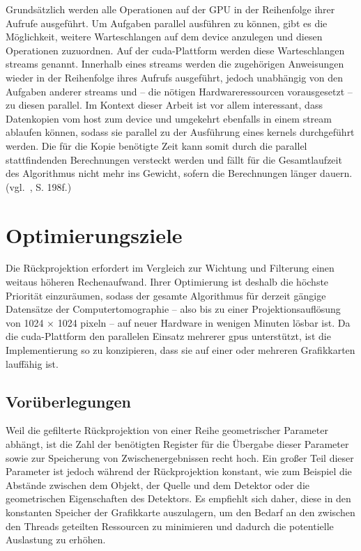 Grundsätzlich werden alle Operationen auf der GPU in der Reihenfolge ihrer Aufrufe ausgeführt. Um Aufgaben parallel
ausführen zu können, gibt es die Möglichkeit, weitere Warteschlangen auf dem \gls{device} anzulegen und diesen
Operationen zuzuordnen. Auf der \gls{cuda}-Plattform werden diese Warteschlangen \glspl{stream} genannt. Innerhalb eines
\glspl{stream} werden die zugehörigen Anweisungen wieder in der Reihenfolge ihres Aufrufs ausgeführt, jedoch unabhängig
von den Aufgaben anderer \glspl{stream} und -- die nötigen Hardwareressourcen vorausgesetzt -- zu diesen parallel. Im
Kontext dieser Arbeit ist vor allem interessant, dass Datenkopien vom \gls{host} zum \gls{device} und umgekehrt
ebenfalls in einem \gls{stream} ablaufen können, sodass sie parallel zu der Ausführung eines \gls{kernel}s durchgeführt
werden. Die für die Kopie benötigte Zeit kann somit durch die parallel stattfindenden Berechnungen versteckt werden und
fällt für die Gesamtlaufzeit des Algorithmus nicht mehr ins Gewicht, sofern die Berechnungen länger dauern.
(vgl.~\cite{sandkand}, S. 198f.)

\section{Optimierungsziele}\label{optimierungsziele}

Die Rückprojektion erfordert im Vergleich zur Wichtung und Filterung einen weitaus höheren Rechenaufwand. Ihrer
Optimierung ist deshalb die höchste Priorität einzuräumen, sodass der gesamte Algorithmus für derzeit gängige Datensätze
der Computertomographie -- also bis zu einer Projektionsauflösung von 1024 $\times$ 1024 \gls{pixel}n -- auf neuer
Hardware in wenigen Minuten lösbar ist. Da die \gls{cuda}-Plattform den parallelen Einsatz mehrerer \gls{gpu}s
unterstützt, ist die Implementierung so zu konzipieren, dass sie auf einer oder mehreren Grafikkarten lauffähig ist.

\subsection*{Vorüberlegungen}

Weil die gefilterte Rückprojektion von einer Reihe geometrischer Parameter abhängt, ist die Zahl der benötigten Register
für die Übergabe dieser Parameter sowie zur Speicherung von Zwischenergebnissen recht hoch. Ein großer Teil dieser
Parameter ist jedoch während der Rückprojektion konstant, wie zum Beispiel die Abstände zwischen dem Objekt, der Quelle
und dem Detektor oder die geometrischen Eigenschaften des Detektors. Es empfiehlt sich daher, diese in den konstanten
Speicher der Grafikkarte auszulagern, um den Bedarf an den zwischen den Threads geteilten Ressourcen zu minimieren und
dadurch die potentielle Auslastung zu erhöhen.

